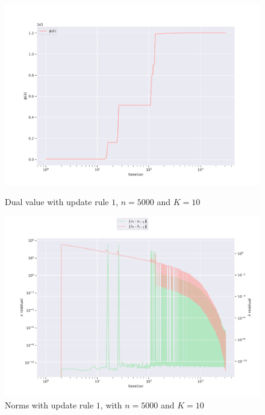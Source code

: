 \documentclass[notitlepage]{article}
\begin{document}
\begin{figure}[H]
  \begin{minipage}{0.49\textwidth}
    \centering
    \includegraphics[scale=0.33]{pics/n=5000_K=10_dual_rule=1.png}
    \caption{Dual value with update rule $1$, $n=5000$ and $K=10$}
    \label{fig:rule-1-n-5000-k-10-dual}
  \end{minipage}
  \begin{minipage}{0.49\textwidth}
    \centering
    \includegraphics[scale=0.33]{pics/n=5000_K=10_lambda_rule=1.png}
    \caption{Norms with update rule $1$, with $n=5000$ and $K=10$}
    \label{fig:rule-1-n-5000-k-10-norm}
  \end{minipage}  
\end{figure}

\vfill
\hspace{0pt}
\end{document}
